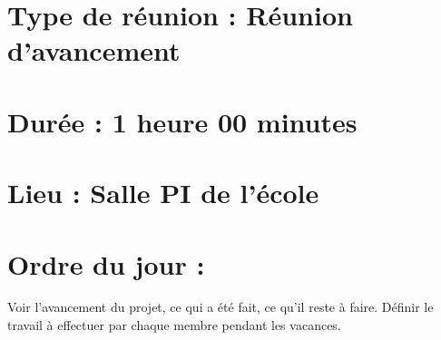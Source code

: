 \documentclass[11pt]{meetingmins}
\begin{document}
\maketitle
\section{Type de réunion : \textnormal{Réunion d'avancement} }

\section{Durée : \textnormal{1 heure 00 minutes} }
\section{Lieu : \textnormal{Salle PI de l'école} }


\section{}
\section{Ordre du jour :}
\begin{hiddenitems}

Voir l'avancement du projet, ce qui a été fait, ce qu'il reste à faire. Définir le travail à effectuer par chaque membre pendant les vacances.
\end{hiddenitems}
\end{document}
